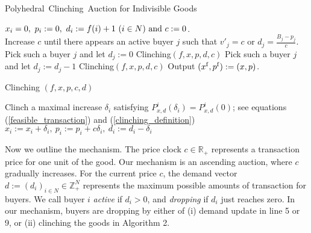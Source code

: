 \documentclass[letterpaper,11pt]{article}
\begin{document}
	\begin{algorithm}[htb]
	\caption{Polyhedral\ Clinching\ Auction for Indivisible Goods} 
	\begin{algorithmic}[1]
	  \STATE $x_i=0,\ p_i:=0,\ d_i:=f(i)+1 \ 
	  (i\in N)\ {\rm and}\ c:=0$.\\
	  \STATE Increase $c$ until there appears an active buyer 
	  $j$ such that $v'_{j}=c$ or $d_{j}=\frac{B_{j}-p_{j}}{c}$.
	  \STATE Pick such a buyer $j$ and let $d_{j}:=0$
	  \STATE Clinching$(f,x,p,d,c)$
	  \ENDWHILE
	  \STATE Pick such a buyer $j$ and let $d_{j}:=d_{j}-1$
	  \STATE Clinching$(f,x,p,d,c)$
	  \ENDWHILE
	 \ENDWHILE
	 \STATE Output $(x^{\rm f}, p^{\rm f}):=(x,p)$.
	\end{algorithmic}
	\end{algorithm}
	
	\begin{comment}
	\begin{algorithm}[htb]
	\caption{Clinching $(f,x,p,c,d)$} 
	\begin{algorithmic}[1]
	  \FOR{$i=1,2,\ldots,n$} 
	 \STATE $P_{x,d}\rightarrow\{y\in \mathbb R^N_{+}\mid x+y\in P,\ y_i\leq d_i \ (i\in N)\}$,\ $P^i_{x,d}(w_i)\rightarrow\{u\vert_{N\setminus i}\mid \exists u\in P_{x,d}\ {\rm s.t.}\ u_i=w_i\}$
	  \STATE $\delta_i\rightarrow\sup\{w_i\geq 0\mid P^i_{x,d}(w_i)=P^i_{x,d}(0)\}$
	  \STATE 
	  $\displaystyle x_i:=x_i+\delta_i,\ p_i:=p_i+c \delta_i,\ d_i:=d_i-\delta_i$
	  \ENDFOR
	\end{algorithmic}
	\end{algorithm}
	\end{comment}
	
	\begin{algorithm}[htb]
	\caption{Clinching $(f,x,p,c,d)$} 
	\begin{algorithmic}[1]
	  \STATE Clinch a maximal increase 
	  $\delta_i$ satisfying $P^i_{x,d}(\delta_{i})=P^i_{x,d}(0)$; see equations (\ref{feasible_transaction}) 
	  and (\ref{clinching_definition})
	  \STATE 
	  $\displaystyle x_i:=x_i+\delta_i,\ p_i:=p_i+c \delta_i,\ d_i:=d_i-\delta_i$
	  \ENDFOR
	\end{algorithmic}
	\end{algorithm}

	
Now we outline the mechanism.
The price clock $c\in \mathbb R_{+}$ represents a transaction price for one unit of the good. 
Our mechanism is an ascending auction, where $c$ gradually increases.
For the current price $c$, the demand vector $d:=(d_i)_{i\in N}\in \mathbb Z^{N}_{+}$ represents 
the maximum possible amounts of transaction for buyers.
We call buyer $i$ {\it active} if $d_i>0$, and {\it dropping} if $d_i$ just reaches zero.	
In our mechanism, buyers are dropping by either of (i) demand update in line 5 or 9, 
or (ii) clinching the goods in Algorithm 2. 
\end{document}

